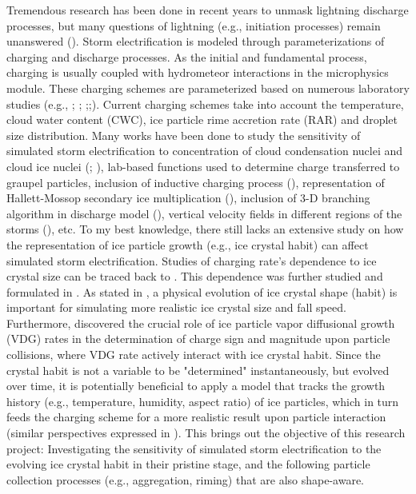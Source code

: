Tremendous research has been done in recent years to unmask lightning discharge processes, but many questions of lightning (e.g., initiation processes) remain unanswered (\cite{mazur2016lightning}). Storm electrification is modeled through parameterizations of charging and discharge processes. As the initial and fundamental process, charging is usually coupled with hydrometeor interactions in the microphysics module. These charging schemes are parameterized based on numerous laboratory studies (e.g., \cite{reynolds1957thunderstorm}; \cite{takahashi1978riming}; \cite{jayaratne1983laboratory};\cite{saunders1991effect};\cite{saunders1998laboratory}). Current charging schemes take into account the temperature, cloud water content (CWC), ice particle rime accretion rate (RAR) and droplet size distribution. Many works have been done to study the sensitivity of simulated storm electrification to concentration of cloud condensation nuclei and cloud ice nuclei (\cite{takahashi1984thunderstorm}; \cite{mansell2013aerosol}), lab-based functions used to determine charge transferred to graupel particles, inclusion of inductive charging process (\cite{mansell2005charge}), representation of Hallett-Mossop secondary ice multiplication (\cite{mansell2013aerosol}), inclusion of 3-D branching algorithm in discharge model (\cite{barthe2007simulation}), vertical velocity fields in different regions of the storms (\cite{wang2015impact}), etc. To my best knowledge, there still lacks an extensive study on how the representation of ice particle growth (e.g., ice crystal habit) can affect simulated storm electrification. Studies of charging rate's dependence to ice crystal size can be traced back to \cite{jayaratne1983laboratory}. This dependence was further studied and formulated in \cite{keith1989charge,
keith1990further}. As stated in \cite{harrington2013methoda,harrington2013methodb}, a physical evolution of ice crystal shape (habit) is important for simulating more realistic ice crystal size and fall speed. Furthermore, \cite{baker1987influence} discovered the crucial role of ice particle vapor diffusional growth (VDG) rates in the determination of charge sign and magnitude upon particle collisions, where VDG rate actively interact with ice crystal habit. Since the crystal habit is not a variable to be "determined" instantaneously, but evolved over time, it is potentially beneficial to apply a model that tracks the growth history (e.g., temperature, humidity, aspect ratio) of ice particles, which in turn feeds the charging scheme for a more realistic result upon particle interaction (similar perspectives expressed in \cite{keith1990further}). This brings out the objective of this research project: Investigating the sensitivity of simulated storm electrification to the evolving ice crystal habit in their pristine stage, and the following particle collection processes (e.g., aggregation, riming) that are also shape-aware.
